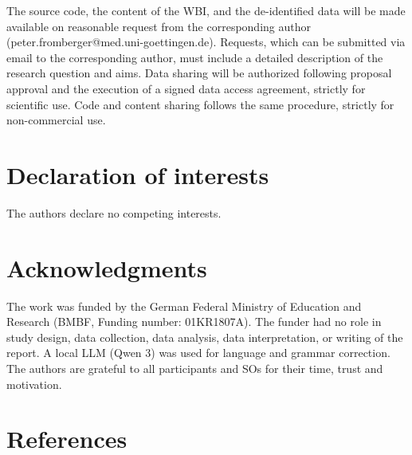 \documentclass[
  super,
  preprint,
  1p,
  onecolumn]{elsarticle}
\begin{document}
The source code, the content of the WBI, and the de-identified data will
be made available on reasonable request from the corresponding author
(peter.fromberger@med.uni-goettingen.de). Requests, which can be
submitted via email to the corresponding author, must include a detailed
description of the research question and aims. Data sharing will be
authorized following proposal approval and the execution of a signed
data access agreement, strictly for scientific use. Code and content
sharing follows the same procedure, strictly for non-commercial use.

\section*{Declaration of interests}\label{declaration-of-interests}

The authors declare no competing interests.

\section*{Acknowledgments}\label{acknowledgments}

The work was funded by the German Federal Ministry of Education and
Research (BMBF, Funding number: 01KR1807A). The funder had no role in
study design, data collection, data analysis, data interpretation, or
writing of the report. A local LLM (Qwen 3) was used for language and
grammar correction. The authors are grateful to all participants and SOs
for their time, trust and motivation.

\newpage{}

\section*{References}\label{references}

\renewcommand{\bibsection}{}

\end{document}

